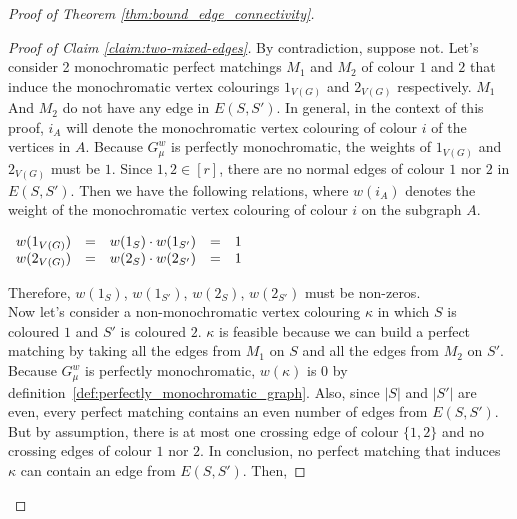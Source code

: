 \begin{proof}[Proof of Theorem \ref{thm:bound_edge_connectivity}]
\begin{enumerate}
\begin{enumerate}
                    \begin{proof}[Proof of Claim \ref{claim:two-mixed-edges}]
                        By contradiction, suppose not.
                        Let's consider 2 monochromatic perfect matchings $M_1$ and $M_2$ of colour $1$ and $2$ that induce the monochromatic vertex colourings $1_{V(G)}$ and $2_{V(G)}$ respectively.
                        $M_1$ And $M_2$ do not have any edge in $E(S, S')$.
                        In general, in the context of this proof, $i_A$ will denote the monochromatic vertex colouring of colour $i$ of the vertices in $A$.
                        Because $G_\mu^w$ is perfectly monochromatic, the weights of $1_{V(G)}$ and $2_{V(G)}$ must be $1$.     %
                        Since $1, 2 \in [r]$, there are no normal edges of colour $1$ nor $2$ in $E(S, S')$.
                        Then we have the following relations, where $w(i_A)$ denotes the weight of the monochromatic vertex colouring of colour $i$ on the subgraph $A$.
                        
                        \begin{center}
                            $\begin{array}{l c l c l}
                                w(1_{V(G)}) & = & w(1_S) \cdot w(1_{S'}) & = & 1 \\
                                w(2_{V(G)}) & = & w(2_S) \cdot w(2_{S'}) & = & 1
                            \end{array}$
                        \end{center}
                        
                        Therefore, $w(1_S)$, $w(1_{S'})$, $w(2_S)$, $w(2_{S'})$ must be non-zeros. \\

                        Now let's consider a non-monochromatic vertex colouring $\kappa$ in which $S$ is coloured $1$ and $S'$ is coloured $2$.
                        $\kappa$ is feasible because we can build a perfect matching by taking all the edges from $M_1$ on $S$ and all the edges from $M_2$ on $S'$.
                        Because $G_\mu^w$ is perfectly monochromatic, $w(\kappa)$ is 0 by definition~\ref{def:perfectly_monochromatic_graph}.
                        Also, since $|S|$ and $|S'|$ are even, every perfect matching contains an even number of edges from $E(S, S')$.
                        But by assumption, there is at most one crossing edge of colour $\{1, 2\}$ and no crossing edges of colour $1$ nor $2$.
                        In conclusion, no perfect matching that induces $\kappa$ can contain an edge from $E(S, S')$.
                        Then,
                        

\end{proof}
\end{enumerate}
\end{enumerate}
\end{proof}
